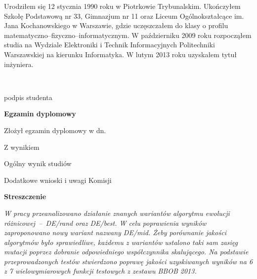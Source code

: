 \begin{titlepage}
    \indent
Urodziłem się 12 stycznia 1990 roku w Piotrkowie Trybunalskim. Ukończyłem Szkołę Podstawową
nr 33, Gimnazjum nr 11 oraz Liceum Ogólnokształcące im. Jana Kochanowskiego w Warszawie, gdzie
uczęszczałem do klasy o profilu matematyczno--fizyczno--informatycznym.
W październiku 2009 roku rozpocząłem studia na Wydziale Elektroniki i Technik Informacyjnych
Politechniki Warszawskiej na kierunku Informatyka. W lutym 2013 roku uzyskałem tytuł inżyniera.

    \par
    \vspace{3\baselineskip}
    \hfill\parbox{15em}{{\small\dotfill}\\[-.3ex]
    \centerline{\footnotesize podpis studenta}}\par
    \vspace{2\baselineskip}
    \begin{center}
 	{\large\bfseries Egzamin dyplomowy} \par\bigskip
    \end{center}
    \par\noindent\vspace{1\baselineskip}
    Złożył egzamin dyplomowy w dn. \dotfill
    \par\noindent\vspace{1\baselineskip}
    Z wynikiem \dotfill
    \par\noindent\vspace{1\baselineskip}
    Ogólny wynik studiów \dotfill
    \par\noindent\vspace{1\baselineskip}
    Dodatkowe wnioski i uwagi Komisji \dotfill
  
    \newpage\thispagestyle{empty}
    \vspace*{2\baselineskip}
    \begin{center}
	{\large\bfseries Streszczenie}\par\bigskip
    \end{center}

    {\itshape
W pracy przeanalizowano działanie znanych wariantów algorytmu ewolucji różnicowej~--~DE/rand
oraz DE/best. W celu poprawienia wyników zaproponowano nowy wariant nazwany DE/mid. 
Żeby porównanie jakości algorytmów było sprawiedliwe, każdemu z wariantów ustalono taki sam zasięg
mutacji poprzez dobranie odpowiedniego współczynnika skalującego.
Na podstawie przeprowadzonych testów stwierdzono poprawę jakości uzyskiwanych wyników na 6 z 7 
wielowymiarowych funkcji testowych z zestawu BBOB 2013.}
    \vspace*{1\baselineskip}


\end{titlepage}
